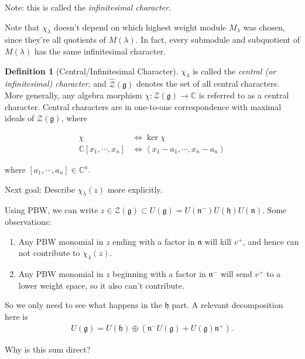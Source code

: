 \documentclass[11pt]{scrartcl}
\theoremstyle{definition}
\theoremstyle{theorem}
\theoremstyle{proof}
\theoremstyle{definition}
\newtheorem{definition}{Definition}[theorem]
\theoremstyle{break}
\theoremstyle{problem}
\providecommand{\tightlist}{%
  \setlength{\itemsep}{0pt}\setlength{\parskip}{0pt}}
\DeclarePairedDelimiter\qty{(}{)}
\renewcommand{\qty}[1]{{\left(  {#1} \right)}}
\newcommand{\CC}[0]{{\mathbb{C}}}
\newcommand{\generators}[1]{\left\langle{#1}\right\rangle}
\newcommand{\lieg}[0]{{\mathfrak{g}}}
\newcommand{\lieh}[0]{{\mathfrak{h}}}
\newcommand{\lien}[0]{{\mathfrak{n}}}
\newcommand{\mcz}[0]{{\mathcal{Z}}}
\renewcommand{\hat}[1]{\widehat{#1}}
\renewcommand{\to}[0]{\longrightarrow}
\begin{document}
Note: this is called the \emph{infinitesimal character}.

Note that \(\chi_\lambda\) doesn't depend on which highest weight module
\(M_\lambda\) was chosen, since they're all quotients of \(M(\lambda)\).
In fact, every submodule and subquotient of \(M(\lambda)\) has the same
infinitesimal character.

\begin{definition}[Central/Infinitesimal Character]

\(\chi_\lambda\) is called the \emph{central (or infinitesimal)
character}, and \(\hat\mcz(\lieg)\) denotes the set of all central
characters. More generally, any algebra morphism
\(\chi: \mcz(\lieg) \to \CC\) is referred to as a central character.
Central characters are in one-to-one correspondence with maximal ideals
of \(\mcz(\lieg)\), where

\begin{align*}
\chi & \iff \ker \chi \\
\CC[x_1, \cdots, x_n] &\iff \generators{x_1 - a_1, \cdots, x_n - a_n}
\end{align*}

where \([a_1, \cdots, a_n] \in \CC^n\).\end{definition}

Next goal: Describe \(\chi_\lambda(z)\) more explicitly.

Using PBW, we can write
\(z\in \mcz(\lieg) \subset U(\lieg) = U(\lien^-) U(\lieh) U(\lien)\).
Some observations:

\begin{enumerate}
\def\labelenumi{\arabic{enumi}.}
\tightlist
\item
  Any PBW monomial in \(z\) ending with a factor in \(\lien\) will kill
  \(v^+\), and hence can not contribute to \(\chi_\lambda(z)\).
\item
  Any PBW monomial in \(z\) beginning with a factor in \(\lien^-\) will
  send \(v^+\) to a lower weight space, so it also can't contribute.
\end{enumerate}

So we only need to see what happens in the \(\lieh\) part. A relevant
decomposition here is
\begin{align*}
U(\lieg) = U(\lieh) \oplus \qty{ \lien^- U(\lieg) + U(\lieg)\lien^+  }
.\end{align*}

\begin{description}
\tightlist
\item[Exercise]
Why is this sum direct?
\end{description}
\end{document}
